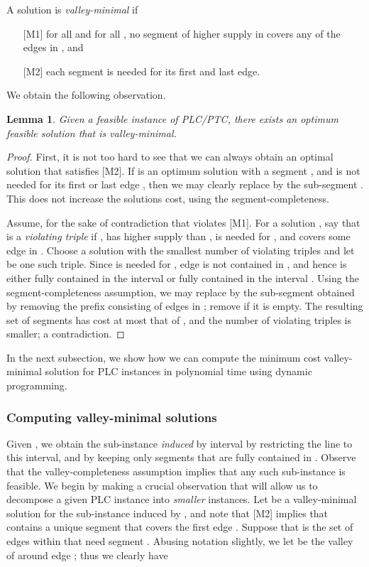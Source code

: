 \documentclass[11pt]{article}
\newtheorem{lemma}{Lemma}
\newcommand{\1}{\mathbb{1}}
\begin{document}
{A solution  is {\em
  valley-minimal} if 
\begin{itemize}
\item[ {[M1]} ] for all  and for all , no
  segment of higher supply in  covers any of the edges in
  , and
  \item[ {[M2]} ]  each segment is needed for its first and 
    last edge.
\end{itemize}


We obtain the following observation.

\begin{lemma}
  Given a feasible instance of PLC/PTC, there exists an optimum feasible
  solution that is valley-minimal.
\end{lemma}
\begin{proof}
  First, it is not too hard to see that we can always obtain an optimal 
  solution that satisfies [M2]. If  is an optimum solution with a 
  segment , and  is not needed for its first or last edge ,
  then we may clearly replace  by the sub-segment . This 
  does not increase the solutions cost, using the segment-completeness.
  
  Assume, for the sake of contradiction that  violates [M1]. 
For a solution , say that 
 is a {\em violating triple} if ,  has higher supply than  ,  is
needed for , and  covers some edge in . 
  Choose a solution  with the smallest number of violating triples and
  let  be one such triple. Since  is needed for , edge
   is not contained in , and hence  is either fully
  contained in the interval  or fully contained in the interval
  .  Using the segment-completeness assumption, we may replace
   by the sub-segment  obtained by removing the prefix
  consisting of edges in ; remove  if it is empty. The
  resulting set of segments has cost at most that of , and the
  number of violating triples is smaller; a contradiction.
\end{proof}

In the next subsection, we show how we can compute the minimum cost
valley-minimal solution for PLC instances in polynomial time using
dynamic programming.

\subsubsection{Computing valley-minimal solutions}

Given , we obtain the sub-instance {\em
  induced} by interval  by restricting the line  to this
interval, and by keeping only segments that are fully contained in
.  Observe that the valley-completeness assumption implies that
any such sub-instance is feasible.  We begin by making a crucial
observation that will allow us to decompose a given PLC instance into
{\em smaller} instances.  Let  be a valley-minimal solution for the
sub-instance induced by , and note that [M2] implies that 
contains a unique segment  that covers the first edge .
Suppose that  is the set of edges
within  that need segment . Abusing notation slightly, we
let  be the valley of  around edge ;
thus we clearly have

}
\end{document}
